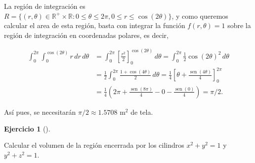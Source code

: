 \documentclass[
  spanish,
  a4paper,
]{scrreport}
\theoremstyle{definition}
\newtheorem{exercise}{Ejercicio}[chapter]
\theoremstyle{remark}
\begin{document}
\begin{tcolorbox}[enhanced jigsaw, arc=.35mm, bottomrule=.15mm, bottomtitle=1mm, breakable, colback=white, colbacktitle=quarto-callout-tip-color!10!white, colframe=quarto-callout-tip-color-frame, coltitle=black, left=2mm, leftrule=.75mm, opacityback=0, opacitybacktitle=0.6, rightrule=.15mm, title=\textcolor{quarto-callout-tip-color}{\faLightbulb}\hspace{0.5em}{Solución}, titlerule=0mm, toprule=.15mm, toptitle=1mm]

La región de integración es
\(R=\{(r,\theta)\in \mathbb{R}^+\times\mathbb{R}: 0\leq \theta\leq 2\pi, 0\leq r\leq \cos(2\theta)\}\),
y como queremos calcular el area de esta región, basta con integrar la
función \(f(r,\theta)=1\) sobre la región de integración en coordenadas
polares, es decir,

\begin{align*}
\int_0^{2\pi} \int_0^{\cos(2\theta)} r\,dr\,d\theta
&= \int_0^{2\pi} \left[\frac{r^2}{2}\right]_0^{\cos(2\theta)} \,d\theta
= \int_0^{2\pi} \frac{1}{2}\cos(2\theta)^2 \,d\theta \\
&= \frac{1}{2}\int_0^{2\pi} \frac{1+\cos(4\theta)}{2} \,d\theta 
= \frac{1}{4} \left[\theta + \frac{\operatorname{sen}(4\theta)}{4}\right]_0^{2\pi}\\
&= \frac{1}{4}\left(2\pi + \frac{\operatorname{sen}(8\pi)}{4}-0-\frac{\operatorname{sen}(0)}{4}\right)
=\pi/2.
\end{align*}

Así pues, se necesitarán \(\pi/2\approx 1.5708\) m\(^2\) de tela.

\end{tcolorbox}

\begin{exercise}[]\protect\hypertarget{exr-volumen-cilindros}{}\label{exr-volumen-cilindros}

Calcular el volumen de la región encerrada por los cilindros
\(x^2+y^2=1\) y \(y^2+z^2=1\).

\end{exercise}
\end{document}
